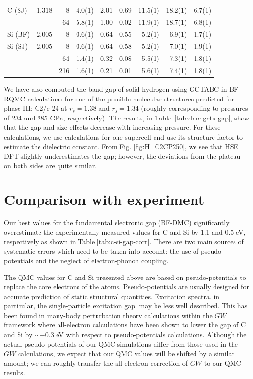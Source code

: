 \begin{table}
\begin{tabular}{lrrrrrrrr}
\hline
C (SJ) & 1.318 &   8 & 4.0(1) & 2.01 & 0.69 & 11.5(1) & 18.2(1) & 6.7(1) \\
  &  &  64 & 5.8(1)   & 1.00 & 0.02 & 11.9(1) & 18.7(1) & 6.8(1) \\
\hline
Si (BF) & 2.005 &   8 & 0.6(1) & 0.64 & 0.55 & 5.2(1) & 6.9(1) & 1.7(1) \\
\hline
Si (SJ) & 2.005 &   8 & 0.6(1) & 0.64 & 0.58 &  5.2(1) &  7.0(1) & 1.9(1) \\
 &  &  64 & 1.4(1)   & 0.32 & 0.08 &  5.5(1) &  7.3(1) & 1.8(1) \\
 &  & 216 & 1.6(1)   & 0.21 & 0.01 &  5.6(1) &  7.4(1) & 1.8(1) \\
\hline
\hline
\end{tabular}
\end{table}

We have also computed the band gap of solid hydrogen using GCTABC in BF-RQMC calculations
for one of the possible
molecular structures predicted for phase III: C2/c-24 at $r_s = 1.38$ and $r_s=1.34$ (roughly corresponding  to pressures of 234 and 285 GPa, respectively). The results, in Table~\ref{tab:dmc-gcta-gap}, show that the gap and size effects decrease with increasing pressure.
For these calculations, we use calculations for one supercell and use its structure factor to estimate the dielectric constant. From Fig. \ref{fig:H_C2CP250}, we see that HSE DFT slightly underestimates the gap; however, the deviations from the plateau on both sides are quite similar.

\section{Comparison with experiment}
\label{sec:bg-compare}

Our best values for the fundamental electronic gap (BF-DMC)  significantly overestimate the experimentally measured values for C and Si  by 1.1 and 0.5 eV, respectively as shown in Table \ref{tab:c-si-gap-corr}. There are two main sources of systematic errors which need to be taken into account: the use of pseudo-potentials and the neglect of electron-phonon coupling.

The QMC values for C and Si presented above are based on pseudo-potentials to replace the 
core electrons of the atoms. Pseudo-potentials are usually designed for accurate prediction of
static structural quantities. Excitation spectra, in particular, the single-particle excitation gap,
may be less well described.
This has been found in many-body perturbation theory calculations within the $GW$ framework
where all-electron calculations have been shown to lower the gap of C and Si by $\sim -0.3$ eV
\cite{Wu02,GomezAbal08}
with respect to  pseudo-potentials calculations.
Although the actual pseudo-potentials of our QMC simulations differ from those used in the
$GW$ calculations, 
we expect that our QMC values will be shifted by a similar amount; we can roughly transfer
the all-electron correction of $GW$ to our QMC results.

